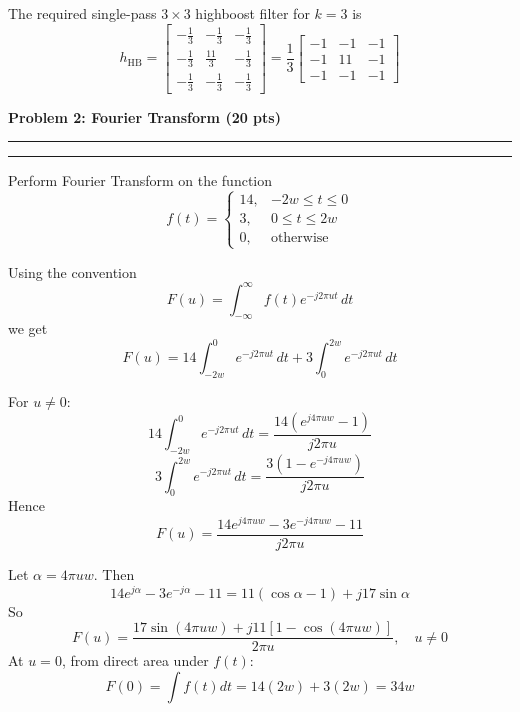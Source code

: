 \documentclass[12pt]{article}
\newcommand{\question}[1]{%
  \clearpage
  \vspace{0.5cm}
  {\noindent\normalsize \textbf{#1}}
  \vspace{0.2cm}
  \hrule
  \vspace{0.1cm}
  \hrule
  \vspace{0.3cm}
}
\begin{document}
\begin{resultsbox}
The required single-pass $3\times 3$ highboost filter for $k=3$ is
\[
\boxed{
h_{\text{HB}} =
\begin{bmatrix}
-\frac13 & -\frac13 & -\frac13 \\
-\frac13 & \frac{11}{3} & -\frac13 \\
-\frac13 & -\frac13 & -\frac13
\end{bmatrix}
= \frac13
\begin{bmatrix}
-1 & -1 & -1 \\
-1 & 11 & -1 \\
-1 & -1 & -1
\end{bmatrix}}
\]
\end{resultsbox}



\question{Problem 2: Fourier Transform (20 pts)}\label{quest:2}

Perform Fourier Transform on the function
\[
f(t) =
\begin{cases}
14, & -2w \le t \le 0 \\
3,  & 0 \le t \le 2w \\
0,  & \text{otherwise}
\end{cases}
\]

\vspace{0.4cm}

\begin{stepbox}
Using the convention
\[
F(u) = \int_{-\infty}^{\infty} f(t)e^{-j2\pi ut}\,dt
\]
we get
\[
F(u)=14\int_{-2w}^{0}e^{-j2\pi ut}\,dt+3\int_{0}^{2w}e^{-j2\pi ut}\,dt
\]
\end{stepbox}

\begin{stepbox}
For $u\neq 0$:
\[
14\int_{-2w}^{0}e^{-j2\pi ut}\,dt
=\frac{14\left(e^{j4\pi uw}-1\right)}{j2\pi u}
\]
\[
3\int_{0}^{2w}e^{-j2\pi ut}\,dt
=\frac{3\left(1-e^{-j4\pi uw}\right)}{j2\pi u}
\]
Hence
\[
F(u)=\frac{14e^{j4\pi uw}-3e^{-j4\pi uw}-11}{j2\pi u}
\]
\end{stepbox}

\begin{stepbox}
Let $\alpha=4\pi uw$. Then
\[
14e^{j\alpha}-3e^{-j\alpha}-11
=11(\cos\alpha-1)+j17\sin\alpha
\]
So
\[
F(u)=\frac{17\sin(4\pi uw)+j11\left[1-\cos(4\pi uw)\right]}{2\pi u},\quad u\neq 0
\]
At $u=0$, from direct area under $f(t)$:
\[
F(0)=\int f(t)dt = 14(2w)+3(2w)=34w
\]
\end{stepbox}
\end{document}
